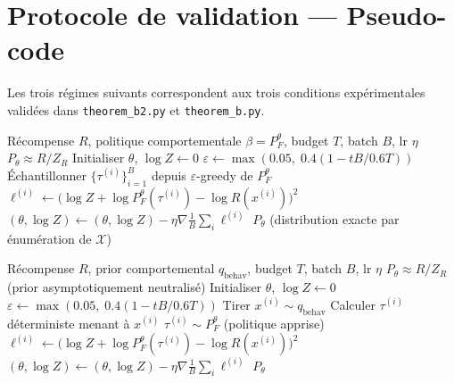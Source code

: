 \documentclass[11pt,a4paper]{article}
\theoremstyle{plain}
\theoremstyle{definition}
\theoremstyle{remark}
\newcommand{\calX}{\mathcal{X}}
\newcommand{\logZ}{\log Z}
\newcommand{\pF}{P_F}
\newcommand{\pth}{P_\theta}
\begin{document}
\section{Protocole de validation — Pseudo-code}
\label{sec:pseudocode}

Les trois régimes suivants correspondent aux trois conditions expérimentales
validées dans \texttt{theorem\_b2.py} et \texttt{theorem\_b.py}.

\begin{algorithm}[ht]
\caption{TB Standard — Régime de référence}
\label{alg:standard}
\begin{algorithmic}[1]
\Require Récompense $R$, politique comportementale $\beta = \pF^\theta$,
         budget $T$, batch $B$, lr $\eta$
\Ensure $\pth \approx R/Z_R$
\State Initialiser $\theta$, $\logZ \leftarrow 0$
  \State $\varepsilon \leftarrow \max(0.05,\; 0.4(1 - tB/0.6T))$
  \State Échantillonner $\{\tau^{(i)}\}_{i=1}^B$ depuis $\varepsilon$-greedy de $\pF^\theta$
    \State $\ell^{(i)} \leftarrow \bigl(\logZ + \log\pF^\theta(\tau^{(i)}) - \log R(x^{(i)})\bigr)^2$
  \EndFor
  \State $(\theta, \logZ) \leftarrow (\theta, \logZ) - \eta \nabla \tfrac{1}{B}\sum_i \ell^{(i)}$
\EndFor
\State \Return $\pth$ (distribution exacte par énumération de $\calX$)
\end{algorithmic}
\end{algorithm}

\begin{algorithm}[ht]
\caption{TB avec prior comportemental seulement — Corollaire~\ref{cor:behav}}
\label{alg:sampling}
\begin{algorithmic}[1]
\Require Récompense $R$, prior comportemental $q_{\mathrm{behav}}$,
         budget $T$, batch $B$, lr $\eta$
\Ensure $\pth \approx R/Z_R$ (prior asymptotiquement neutralisé)
\State Initialiser $\theta$, $\logZ \leftarrow 0$
  \State $\varepsilon \leftarrow \max(0.05,\; 0.4(1 - tB/0.6T))$
    \State Tirer $x^{(i)} \sim q_{\mathrm{behav}}$ 
    \State Calculer $\tau^{(i)}$ déterministe menant à $x^{(i)}$
  \Else
    \State $\tau^{(i)} \sim \pF^\theta$ (politique apprise)
  \EndIf
  \State $\ell^{(i)} \leftarrow \bigl(\logZ + \log\pF^\theta(\tau^{(i)}) - \log R(x^{(i)})\bigr)^2$
  \State $(\theta, \logZ) \leftarrow (\theta, \logZ) - \eta \nabla \tfrac{1}{B}\sum_i \ell^{(i)}$
\EndFor
\State \Return $\pth$
\end{algorithmic}
\end{algorithm}
\end{document}
